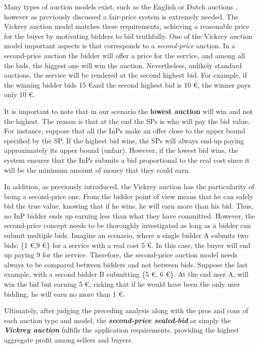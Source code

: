 Many types of auction models exist, such as the English or Dutch auctions \cite{coppinger1980incentives}, however as previously discussed a fair-price system is extremely needed. The Vickrey auction model \cite{vickrey1961counterspeculation} matches these requirements, achieving a reasonable price for the buyer by motivating bidders to bid truthfully. One of the Vickrey auction model important aspects is that corresponds to a \textit{second-price} auction. In a second-price auction the bidder will offer a price for the service, and among all the bids, the higgest one will win the auction. Nevertheless, unlikely standard auctions, the service will be rendered at the second highest bid. For example, if the winning bidder bids 15 \euro and the second highest bid is 10 \euro, the winner pays only 10 \euro.

It is important to note that in our scenario the \textbf{lowest auction} will win and not the highest. The reason is that at the end the SPs is who will pay the bid value. For instance, suppose that all the InPs make an offer close to the upper bound specified by the SP. If the highest bid wins, the SPs will always end-up paying approximately its upper bound (unfair). However, if the lowest bid wins, the system ensures that the InPs submits a bid proportional to the real cost since it will be the minimum amount of money that they could earn.

In addition, as previously introduced, the Vickrey auction has the particularity of being a second-price one. From the bidder point of view means that he can safely bid the true value, knowing that if he wins, he will earn more than his bid. Thus, no InP bidder ends up earning less than what they have committed. However, the second-price concept needs to be thoroughly investigated as long as a bidder can submit multiple bids. Imagine an scenario, where a single bidder A submits two bids: \{1 \euro,9 \euro\} for a service with a real cost 5 \euro. In this case, the buyer will end up paying 9 for the service. Therefore, the second-price auction model needs always to be compared between bidders and not between bids. Suppose the last example, with a second bidder B submitting \{5 \euro, 6 \euro\}. At the end user A, will win the bid but earning 5 \euro, risking that if he would have been the only user bidding, he will earn no more than 1 \euro.

Ultimately, after judging the preceding analysis along with the pros and cons of each auction type and model, the \textbf{\textit{second-price sealed-bid}} or simply the \textbf{\textit{Vickrey auction}} fulfills the application requirements, providing the highest aggregate profit among sellers and buyers.

